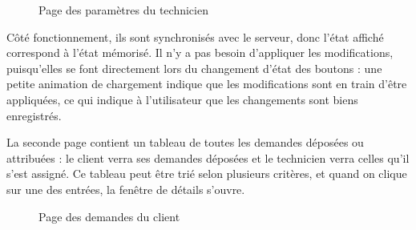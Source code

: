 \documentclass[
    iai, %
    eai, %
]{heig-tb}
\begin{document}
\begin{figure}[h!]
  \caption{Page des paramètres du technicien}
\end{figure}

Côté fonctionnement, ils sont synchronisés avec le serveur, donc l'état affiché correspond à l'état mémorisé.
Il n'y a pas besoin d'appliquer les modifications, puisqu'elles se font directement lors du changement d'état des boutons : une petite animation de chargement indique que les modifications sont en train d'être appliquées, ce qui indique à l'utilisateur que les changements sont biens enregistrés.

\newpage
La seconde page contient un tableau de toutes les demandes déposées ou attribuées : le client verra ses demandes déposées et le technicien verra celles qu'il s'est assigné.
Ce tableau peut être trié selon plusieurs critères, et quand on clique sur une des entrées, la fenêtre de détails s'ouvre.

\begin{figure}[h!]
  \caption{Page des demandes du client}
\end{figure}
\end{document}
